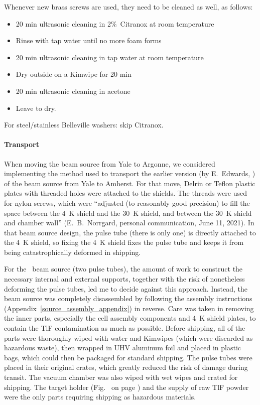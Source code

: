 Whenever new brass screws are used, they need to be cleaned as well, as follows:

\begin{itemize}
   \item 20 min ultrasonic cleaning in 2\%\ Citranox at room temperature
   \item Rinse with tap water until no more foam forms
   \item 20 min ultrasonic cleaning in tap water at room temperature
   \item Dry outside on a Kimwipe for 20 min
   \item 20 min ultrasonic cleaning in acetone
   \item Leave to dry.
\end{itemize}

For steel/stainless Belleville washers: skip Citranox.

\paragraph{Transport}

When moving the beam source from Yale to Argonne, we considered implementing the
method used to transport the earlier version (by E.\ Edwards,
\cite{edwards2023thesis}) of the beam source from Yale to Amherst. For that
move, Delrin or Teflon plastic plates with threaded holes were attached to the
shields. The threads were used for nylon screws, which were ``adjusted (to
reasonably good precision) to fill the space between the 4~K shield and the 30~K
shield, and between the 30~K shield and chamber wall'' (E.\ B.\ Norrgard,
personal communication, June 11, 2021). In that beam source design, the pulse
tube (there is only one) is directly attached to the 4~K shield, so fixing the
4~K shield fixes the pulse tube and keeps it from being catastrophically
deformed in shipping.

For the \CENTREX\ beam source (two pulse tubes), the amount of work to construct
the necessary internal and external supports, together with the risk of
nonetheless deforming the pulse tubes, led me to decide against this approach.
Instead, the beam source was completely disassembled by following the assembly
instructions (Appendix~\ref{source_assembly_appendix}) in reverse. Care was
taken in removing the inner parts, especially the cell assembly components and
4~K shield plates, to contain the TlF contamination as much as possible. Before
shipping, all of the parts were thoroughly wiped with water and Kimwipes (which
were discarded as hazardous waste), then wrapped in UHV aluminum foil and placed
in plastic bags, which could then be packaged for standard shipping. The pulse
tubes were placed in their original crates, which greatly reduced the risk of
damage during transit. The vacuum chamber was also wiped with wet wipes and
crated for shipping. The target holder (Fig.~ on page
\pageref{ablated_target}) and the supply of raw TlF powder were the only parts
requiring shipping as hazardous materials.

